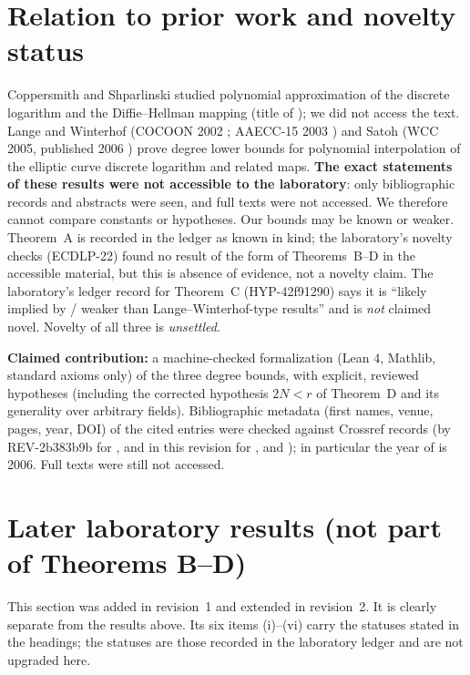 \documentclass[11pt,a4paper]{article}
\theoremstyle{remark}
\begin{document}
\section{Relation to prior work and novelty status}\label{sec:prior}
Coppersmith and Shparlinski \cite{CS00} studied polynomial approximation of the discrete logarithm and the Diffie--Hellman mapping (title of \cite{CS00}); we did not access the text.
Lange and Winterhof (COCOON 2002 \cite{LW02}; AAECC-15 2003 \cite{LW03})
and Satoh (WCC 2005, published 2006 \cite{Sat05}) prove degree lower bounds for polynomial interpolation of
the elliptic curve discrete logarithm and related maps. \textbf{The exact statements of these results were not accessible
to the laboratory}: only bibliographic records and abstracts were seen, and full texts were not accessed. We therefore cannot compare constants or hypotheses.
Our bounds may be known or weaker. Theorem~A is recorded in the ledger as known in kind; the laboratory's novelty checks
(ECDLP-22) found no result of the form of Theorems~B--D in the accessible material, but this is absence of evidence, not a novelty claim.
The laboratory's ledger record for Theorem~C (\mbox{HYP-42f91290}) says it is ``likely implied by / weaker than Lange--Winterhof-type results'' and is \emph{not} claimed novel. Novelty of all three is \emph{unsettled}.

\textbf{Claimed contribution:} a machine-checked formalization (Lean 4, Mathlib, standard axioms only) of the three degree bounds, with explicit,
reviewed hypotheses (including the corrected hypothesis $2N<r$ of Theorem~D and its generality over arbitrary fields). Bibliographic metadata (first names, venue, pages, year, DOI) of the cited entries were checked against Crossref records (by \mbox{REV-2b383b9b} for \cite{LW02}, and in this revision for \cite{LW03}, \cite{Sat05} and \cite{CS00}); in particular the year of \cite{Sat05} is 2006. Full texts were still not accessed.

\section{Later laboratory results (not part of Theorems B--D)}\label{sec:addendum}
This section was added in revision~1 and extended in revision~2. It is clearly separate from the results above. Its six items (i)--(vi) carry the statuses stated in the
headings; the statuses are those recorded in the laboratory ledger and are not upgraded here.
\end{document}
